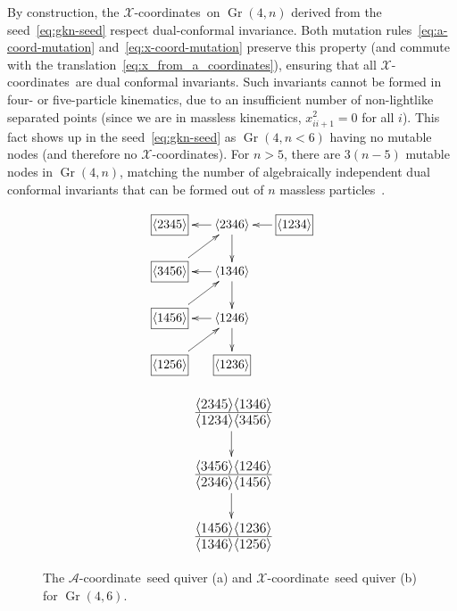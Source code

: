 \documentclass[11pt]{article}
\DeclareMathOperator{\Gr}{Gr}
\def\ket#1{\langle #1 \rangle}
\def\xcoord{$\mathcal{X}$-coordinate}
\def\xcoords{$\mathcal{X}$-coordinates}
\def\acoord{$\mathcal{A}$-coordinate}
\begin{document}
By construction, the \xcoords\ on $\Gr(4,n)$ derived from the seed~\eqref{eq:gkn-seed} respect dual-conformal invariance. Both mutation rules~\eqref{eq:a-coord-mutation} and~\eqref{eq:x-coord-mutation} preserve this property (and commute with the translation~\eqref{eq:x_from_a_coordinates}), ensuring that all \xcoords\ are dual conformal invariants. Such invariants cannot be formed in four- or five-particle kinematics, due to an insufficient number of non-lightlike separated points (since we are in massless kinematics, $x_{ii+1}^2 = 0$ for all $i$). This fact shows up in the seed~\eqref{eq:gkn-seed} as $\Gr(4,n<6)$ having no mutable nodes (and therefore no \xcoords). For $n>5$, there are $3(n-5)$ mutable nodes in $\Gr(4,n)$, matching the number of algebraically independent dual conformal invariants that can be formed out of $n$ massless particles~\cite{}. %

\begin{figure}[t]
\centering
\begin{subfigure}[b]{0.45\textwidth}
\begin{equation*}
\begin{gathered}
\begin{xy} 0;<-.5pt,0pt>:<0pt,-.5pt>::
         (-100,0) *+{\framebox[7ex]{$\ket{1234}$}} ="0",
	(0,0) *+{\ket{2346}} ="1",
	(100,0) *+{\framebox[7ex]{$\ket{2345}$}} ="2",
	(0,75) *+{\ket{1346}} ="3",
	(100,75) *+{\framebox[7ex]{$\ket{3456}$}} ="4",
	(0,150) *+{\ket{1246}} ="5",
	(100,150) *+{\framebox[7ex]{$\ket{1456}$}} ="6",
	(0,225) *+{\framebox[7ex]{$\ket{1236}$}} ="7",
	(100,225) *+{\framebox[7ex]{$\ket{1256}$}} ="8",
	"0", {\ar"1"},
	"1", {\ar"2"},
	"3", {\ar"4"},
	"5", {\ar"6"},
	"1", {\ar"3"},
	"3", {\ar"5"},
	"5", {\ar"7"},
	"4", {\ar"1"},
	"6", {\ar"3"},
	"8", {\ar"5"},
\end{xy}
\end{gathered} 
\end{equation*}
\caption{} \label{fig:g46-a-seed}
\end{subfigure}
\hspace*{\fill} 
\begin{subfigure}[b]{0.45\textwidth}
\begin{equation*}
\begin{gathered}
\begin{xy} 0;<-.5pt,0pt>:<0pt,-.5pt>::
	(0,0) *+\txt{\fontsize{16pt}{16pt} $\frac{\ket{2345}\ket{1346}}{\ket{1234}\ket{3456}}$} ="1",
	(0,100) *+\txt{\fontsize{16pt}{16pt} $\frac{\ket{3456}\ket{1246}}{\ket{2346}\ket{1456}}$} ="3",
	(0,200) *+\txt{\fontsize{16pt}{16pt} $\frac{\ket{1456}\ket{1236}}{\ket{1346}\ket{1256}}$} ="5",
	"1", {\ar"3"},
	"3", {\ar"5"},
\end{xy}
\end{gathered} 
\end{equation*}
\caption{} \label{fig:g46-x-seed}
\end{subfigure}
\caption{The \acoord\ seed quiver (a) and \xcoord\ seed quiver (b) for $\Gr(4,6)$.} 
\label{fig:g46-seed}
\end{figure}
\end{document}
